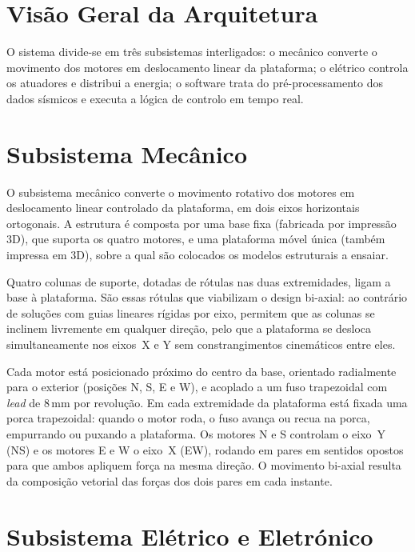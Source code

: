\section{Visão Geral da Arquitetura}
\label{sec:visao-geral}

O sistema divide-se em três subsistemas interligados: o mecânico converte o movimento dos motores em deslocamento linear da plataforma; o elétrico controla os atuadores e distribui a energia; o software trata do pré-processamento dos dados sísmicos e executa a lógica de controlo em tempo real.

\section{Subsistema Mecânico}
\label{sec:subsistema-mecanico}

O subsistema mecânico converte o movimento rotativo dos motores em deslocamento linear controlado da plataforma, em dois eixos horizontais ortogonais. A estrutura é composta por uma base fixa (fabricada por impressão 3D), que suporta os quatro motores, e uma plataforma móvel única (também impressa em 3D), sobre a qual são colocados os modelos estruturais a ensaiar.

Quatro colunas de suporte, dotadas de rótulas nas duas extremidades, ligam a base à plataforma. São essas rótulas que viabilizam o design bi-axial: ao contrário de soluções com guias lineares rígidas por eixo, permitem que as colunas se inclinem livremente em qualquer direção, pelo que a plataforma se desloca simultaneamente nos eixos~X e Y sem constrangimentos cinemáticos entre eles.

Cada motor está posicionado próximo do centro da base, orientado radialmente para o exterior (posições N, S, E e W), e acoplado a um fuso trapezoidal com \textit{lead} de 8\,mm por revolução. Em cada extremidade da plataforma está fixada uma porca trapezoidal: quando o motor roda, o fuso avança ou recua na porca, empurrando ou puxando a plataforma. Os motores N e S controlam o eixo~Y (NS) e os motores E e W o eixo~X (EW), rodando em pares em sentidos opostos para que ambos apliquem força na mesma direção. O movimento bi-axial resulta da composição vetorial das forças dos dois pares em cada instante.

\section{Subsistema Elétrico e Eletrónico}
\label{sec:subsistema-eletrico}

